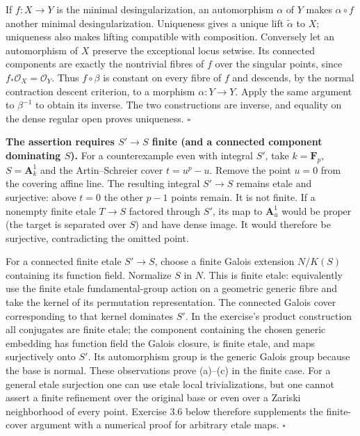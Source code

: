 \documentclass[11pt]{article}
\let\chapterexercise\exercise
\renewcommand{\exercise}[2]{\Needspace{8\baselineskip}\chapterexercise{#1}{#2}}
\begin{document}
\pf If $f:X\to Y$ is the minimal desingularization, an automorphism $\alpha$ of $Y$ makes $\alpha\circ f$ another minimal desingularization. Uniqueness gives a unique lift $\widetilde\alpha$ to $X$; uniqueness also makes lifting compatible with composition. Conversely let an automorphism of $X$ preserve the exceptional locus setwise. Its connected components are exactly the nontrivial fibres of $f$ over the singular points, since $f_*\mathcal O_X=\mathcal O_Y$. Thus $f\circ\beta$ is constant on every fibre of $f$ and descends, by the normal contraction descent criterion, to a morphism $\alpha:Y\to Y$. Apply the same argument to $\beta^{-1}$ to obtain its inverse. The two constructions are inverse, and equality on the dense regular open proves uniqueness. \hfill$\square$

\pf \textbf{The assertion requires $S'\to S$ finite (and a connected component dominating $S$).} For a counterexample even with integral $S'$, take $k=\mathbf F_p$, $S=\mathbf A^1_k$ and the Artin--Schreier cover $t=u^p-u$. Remove the point $u=0$ from the covering affine line. The resulting integral $S'\to S$ remains etale and surjective: above $t=0$ the other $p-1$ points remain. It is not finite. If a nonempty finite etale $T\to S$ factored through $S'$, its map to $\mathbf A^1_u$ would be proper (the target is separated over $S$) and have dense image. It would therefore be surjective, contradicting the omitted point.

For a connected finite etale $S'\to S$, choose a finite Galois extension $N/K(S)$ containing its function field. Normalize $S$ in $N$. This is finite etale: equivalently use the finite etale fundamental-group action on a geometric generic fibre and take the kernel of its permutation representation. The connected Galois cover corresponding to that kernel dominates $S'$. In the exercise's product construction all conjugates are finite etale; the component containing the chosen generic embedding has function field the Galois closure, is finite etale, and maps surjectively onto $S'$. Its automorphism group is the generic Galois group because the base is normal. These observations prove (a)--(c) in the finite case. For a general etale surjection one can use etale local trivializations, but one cannot assert a finite refinement over the original base or even over a Zariski neighborhood of every point. Exercise 3.6 below therefore supplements the finite-cover argument with a numerical proof for arbitrary etale maps. \hfill$\square$
\end{document}
